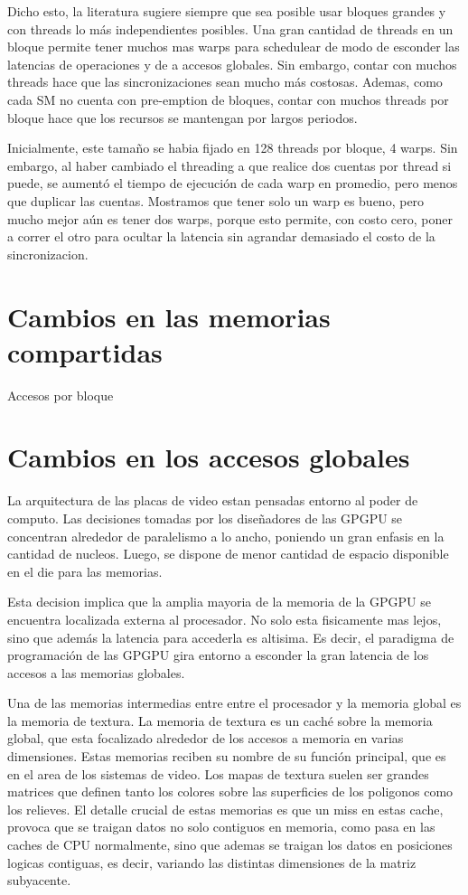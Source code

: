 Dicho esto, la literatura \cite{NVIDIA_OPTIMIZATIONS} sugiere siempre que sea posible
usar bloques grandes y con threads lo m\'as independientes posibles. Una gran cantidad de threads
en un bloque permite tener muchos mas warps para schedulear de modo de esconder las latencias de
operaciones y de a accesos globales. Sin embargo, contar con muchos threads hace que las
sincronizaciones sean mucho m\'as costosas. Ademas, como cada SM no cuenta con pre-emption
de bloques, contar con muchos threads por bloque hace que los recursos se mantengan
por largos periodos.

Inicialmente, este tama\~no se habia fijado en 128 threads por bloque, 4 warps. Sin embargo,
al haber cambiado el threading a que realice dos cuentas por thread si puede, se aument\'o
el tiempo de ejecuci\'on de cada warp en promedio, pero menos que duplicar las cuentas.
Mostramos que tener solo un warp es bueno, pero mucho mejor a\'un es tener dos warps, porque
esto permite, con costo cero, poner a correr el otro para ocultar la latencia sin agrandar
demasiado el costo de la sincronizacion.


\section{Cambios en las memorias compartidas}
Accesos por bloque

\section{Cambios en los accesos globales}
La arquitectura de las placas de video estan pensadas entorno al poder de computo.
Las decisiones tomadas por los diseñadores de las GPGPU se concentran alrededor
de paralelismo a lo ancho, poniendo un gran enfasis en la cantidad de nucleos. Luego,
se dispone de menor cantidad de espacio disponible en el die para las memorias.

Esta decision implica que la amplia mayoria de la memoria de la GPGPU se encuentra
localizada externa al procesador.  No solo esta fisicamente mas lejos, sino que
adem\'as la latencia para accederla es altisima. Es decir, el paradigma de
programaci\'on de las GPGPU gira entorno a esconder la gran latencia de los accesos
a las memorias globales.

Una de las memorias intermedias entre entre el procesador y la memoria global es
la memoria de textura. La memoria de textura es un cach\'e sobre la memoria global,
que esta focalizado alrededor de los accesos a memoria en varias dimensiones.
Estas memorias reciben su nombre de su funci\'on principal, que es en el area de los
sistemas de video. Los mapas de textura suelen ser grandes matrices que definen
tanto los colores sobre las superficies de los poligonos como los relieves.
El detalle crucial de estas memorias es que un miss en estas cache, provoca
que se traigan datos no solo contiguos en memoria, como pasa en las caches de
CPU normalmente, sino que ademas se traigan los datos en posiciones logicas contiguas,
es decir, variando las distintas dimensiones de la matriz subyacente.

